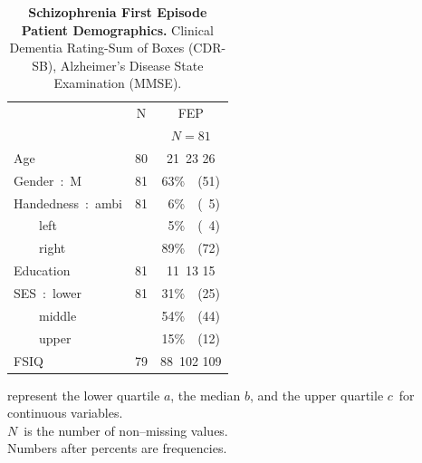 \documentclass{article}\usepackage{graphicx, color}
\newcommand{\mb}{MAGeT-Brain }
\begin{document}
%
%
%
\begin{table}[!tbp]
\scriptsize
\caption{\textbf{Schizophrenia First Episode Patient Demographics.} Clinical Dementia Rating-Sum of Boxes (CDR-SB), Alzheimer's Disease State Examination (MMSE).\label{tab:SZFEP-Demographics}} 
\begin{center}
\begin{tabular}{lrc}
\hline\hline
\multicolumn{1}{l}{}&\multicolumn{1}{c}{N}&\multicolumn{1}{c}{FEP}\tabularnewline
&&\multicolumn{1}{c}{{\scriptsize $N=81$}}\tabularnewline
\hline
Age&80&{\scriptsize 21~}{23 }{\scriptsize 26} \tabularnewline
Gender~:~M&81&63\%~{\scriptsize~(51)}\tabularnewline
Handedness~:~ambi&81&~6\%~{\scriptsize~(~5)}\tabularnewline
~~~~left&&~5\%~{\scriptsize~(~4)}\tabularnewline
~~~~right&&89\%~{\scriptsize~(72)}\tabularnewline
Education&81&{\scriptsize 11~}{13 }{\scriptsize 15} \tabularnewline
SES~:~lower&81&31\%~{\scriptsize~(25)}\tabularnewline
~~~~middle&&54\%~{\scriptsize~(44)}\tabularnewline
~~~~upper&&15\%~{\scriptsize~(12)}\tabularnewline
FSIQ&79&{\scriptsize  88~}{102 }{\scriptsize 109} \tabularnewline
\hline
\end{tabular}
\end{center}
 represent the lower quartile $a$, the median $b$, and the upper quartile $c$\ for continuous variables.\\$N$\ is the number of non--missing values.\\Numbers after percents are frequencies.\end{table}






\end{document}
